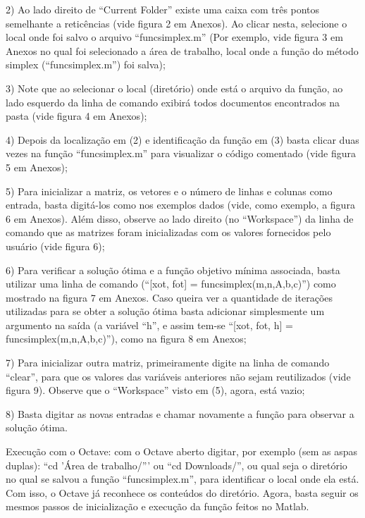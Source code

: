 \documentclass[10pt]{article}
\begin{document}
2) Ao lado direito de ``Current Folder'' existe uma caixa com três pontos semelhante a reticências (vide figura 2 em Anexos). Ao clicar nesta, selecione o local onde foi salvo o arquivo ``funcsimplex.m'' (Por exemplo, vide figura 3 em Anexos no qual foi selecionado a área de trabalho, local onde a função do método simplex  (``funcsimplex.m'') foi salva);
\newline

3) Note que ao selecionar o local (diretório) onde está o arquivo da função, ao lado esquerdo da linha de comando exibirá todos documentos encontrados na pasta (vide figura 4 em Anexos);
\newline

4) Depois da localização em (2) e identificação da função em (3) basta clicar duas vezes na função ``funcsimplex.m'' para visualizar o código comentado (vide figura 5 em Anexos);
\newline

5) Para inicializar a matriz, os vetores e o número de linhas e colunas como entrada, basta digitá-los como nos exemplos dados (vide, como exemplo, a figura 6 em Anexos). Além disso, observe ao lado direito (no ``Workspace'') da linha de comando que as matrizes foram inicializadas com os valores fornecidos pelo usuário (vide figura 6);
\newline

6) Para verificar a solução ótima e a função objetivo mínima associada, basta utilizar uma linha de comando (``[xot, fot] = funcsimplex(m,n,A,b,c)'') como mostrado na figura 7 em Anexos. Caso queira ver a quantidade de iterações utilizadas para se obter a solução ótima basta adicionar simplesmente um argumento na saída (a variável ``h'', e assim tem-se ``[xot, fot, h] = funcsimplex(m,n,A,b,c)''), como na figura 8 em Anexos;
\newline

7) Para inicializar outra matriz, primeiramente digite na linha de comando ``clear'', para que os valores das variáveis anteriores não sejam reutilizados (vide figura 9). Observe que o ``Workspace'' visto em (5), agora, está vazio;
\newline

8) Basta digitar as novas entradas e chamar novamente a função para observar a solução ótima.
\newline

Execução com o Octave: com o Octave aberto digitar, por exemplo (sem as aspas duplas): ``cd 'Área de trabalho/''' ou ``cd Downloads/'', ou qual seja o diretório no qual se salvou a função ``funcsimplex.m'', para identificar o local onde ela está. Com isso, o Octave já reconhece os conteúdos do diretório. Agora, basta seguir os mesmos passos de inicialização e execução da função feitos no Matlab.
\newline
\end{document}
